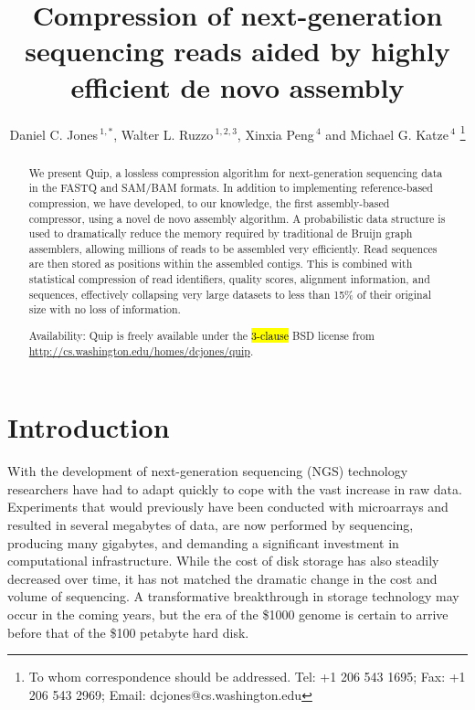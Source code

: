 \documentclass[a4,center,fleqn]{NAR}
\begin{document}
\title{Compression of next-generation sequencing reads aided by highly efficient de novo assembly}

\author{%
Daniel C. Jones\,$^{1,*}$,
Walter L. Ruzzo\,$^{1,2,3}$,
Xinxia Peng\,$^{4}$
and Michael G. Katze\,$^{4}$%
\footnote{To whom correspondence should be addressed.
Tel: +1 206 543 1695; Fax: +1 206 543 2969; Email: dcjones@cs.washington.edu}}


\address{
$^{1}$Department of Computer Science and Engineering,
University of Washington, Seattle, WA 98195-2350, USA
$^{2}$Department of Genome Sciences, University of Washington, Seattle, WA
98195-5065, USA
$^{3}$Fred Hutchinson Cancer Research Center, Seattle, WA 98109, USA
$^{4}$Department of Microbiology, University of Washington, Seattle, WA
98195-7242, USA
}

\history{}

\maketitle

\begin{abstract}
We present Quip, a lossless compression algorithm for next-generation
sequencing data in the FASTQ and SAM/BAM formats. In addition to implementing
reference-based compression, we have developed, to our knowledge, the first
assembly-based compressor, using a novel de novo assembly algorithm. A
probabilistic data structure is used to dramatically reduce the memory
required by traditional de Bruijn graph assemblers, allowing millions of reads
to be assembled very efficiently. Read sequences are then stored as positions
within the assembled contigs. This is combined with statistical compression of
read identifiers, quality scores, alignment information, and sequences,
effectively collapsing very large datasets to less than 15\% of their original
size with no loss of information.

Availability: Quip is freely available under the \hl{3-clause} BSD license from
\url{http://cs.washington.edu/homes/dcjones/quip}.
\end{abstract}

\section{Introduction}

With the development of next-generation sequencing (NGS) technology
researchers have had to adapt quickly to cope with the vast increase in raw
data. Experiments that would previously have been conducted with microarrays
and resulted in several megabytes of data, are now performed by sequencing,
producing many gigabytes, and demanding a significant investment in
computational infrastructure. While the cost of disk storage has also steadily
decreased over time, it has not matched the dramatic change in the cost and
volume of sequencing. A transformative breakthrough in storage technology may
occur in the coming years, but the era of the \$1000 genome is certain to
arrive before that of the \$100 petabyte hard disk.
\end{document}
